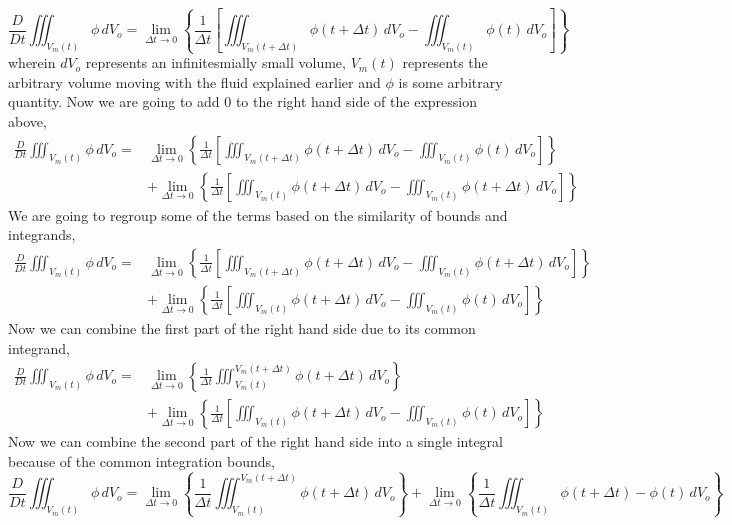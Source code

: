 $$\frac{D}{Dt}\iiint^{}_{V_{m}(t)} \phi \,dV_{o} = \lim_{\Delta t \to 0}\left\{\frac{1}{\Delta t}\left[\iiint^{}_{V_{m}(t+\Delta t)} \phi(t+\Delta t) \,dV_{o} - \iiint^{}_{V_{m}(t)} \phi(t) \,dV_{o}\right]\right\}$$
wherein $dV_{o}$ represents an infinitesmially small volume, $V_{m}(t)$ represents the arbitrary volume moving with the fluid explained earlier and $\phi$ is some arbitrary quantity.
Now we are going to add $0$ to the right hand side of the expression above,
\begin{align*}
\frac{D}{Dt}\iiint^{}_{V_{m}(t)} \phi \,dV_{o} = &\lim_{\Delta t \to 0}\left\{\frac{1}{\Delta t}\left[\iiint^{}_{V_{m}(t+\Delta t)} \phi(t+\Delta t) \,dV_{o} - \iiint^{}_{V_{m}(t)} \phi(t) \,dV_{o}\right]\right\} \\ &
+ \lim_{\Delta t \to 0}\left\{\frac{1}{\Delta t}\left[\iiint^{}_{V_{m}(t)} \phi(t+\Delta t) \,dV_{o} - \iiint^{}_{V_{m}(t)} \phi(t+\Delta t) \,dV_{o}\right]\right\}
\end{align*}
We are going to regroup some of the terms based on the similarity of bounds and integrands,
\begin{align*}
\frac{D}{Dt}\iiint^{}_{V_{m}(t)} \phi \,dV_{o} = &\lim_{\Delta t \to 0}\left\{\frac{1}{\Delta t}\left[\iiint^{}_{V_{m}(t+\Delta t)} \phi(t+\Delta t) \,dV_{o} - \iiint^{}_{V_{m}(t)} \phi(t+\Delta t) \,dV_{o}\right]\right\} \\ &
+ \lim_{\Delta t \to 0}\left\{\frac{1}{\Delta t}\left[\iiint^{}_{V_{m}(t)} \phi(t+\Delta t) \,dV_{o} - \iiint^{}_{V_{m}(t)} \phi(t) \,dV_{o}\right]\right\}
\end{align*}
Now we can combine the first part of the right hand side due to its common integrand,
\begin{align*}
\frac{D}{Dt}\iiint^{}_{V_{m}(t)} \phi \,dV_{o} = &\lim_{\Delta t \to 0}\left\{\frac{1}{\Delta t}\iiint^{V_{m}(t+\Delta t)}_{V_{m}(t)} \phi(t+\Delta t) \,dV_{o}\right\} \\ &
+ \lim_{\Delta t \to 0}\left\{\frac{1}{\Delta t}\left[\iiint^{}_{V_{m}(t)} \phi(t+\Delta t) \,dV_{o} - \iiint^{}_{V_{m}(t)} \phi(t) \,dV_{o}\right]\right\}
\end{align*}
Now we can combine the second part of the right hand side into a single integral because of the common integration bounds,
\begin{equation}
\frac{D}{Dt}\iiint^{}_{V_{m}(t)} \phi \,dV_{o} = \lim_{\Delta t \to 0}\left\{\frac{1}{\Delta t}\iiint^{V_{m}(t+\Delta t)}_{V_{m}(t)} \phi(t+\Delta t) \,dV_{o}\right\} + \lim_{\Delta t \to 0}\left\{\frac{1}{\Delta t}\iiint^{}_{V_{m}(t)} \phi(t+\Delta t) - \phi(t) \,dV_{o}\right\}
\label{Reynolds Transport Theorem Primitive 1}
\end{equation}
